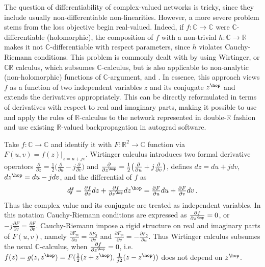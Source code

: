 \documentclass[a4paper,10pt]{article}
\newcommand{\real}{\mathbb{R}}
\newcommand{\cplx}{\mathbb{C}}
\begin{document}
The question of differentiability of complex-valued networks is tricky, since they include
usually non-differentiable non-linearities. However, a more severe problem stems from the loss
objective begin real-valued. Indeed, if $f\colon \cplx \to \cplx$ were $\cplx$-differentiable
(holomorphic), the composition of $f$ with a non-trivial $h \colon \cplx\to \real$ makes it
not $\cplx$-differentiable with respect parameters, since $h$ violates Cauchy-Riemann conditions.
This problem is commonly dealt with by using Wirtinger, or $\cplx\real$ calculus, which subsumes
$\cplx$-calculus, but is also applicable to non-analytic (non-holomorphic) functions of
$\cplx$-argument, \cite{adali_complex-valued_2011} and \cite{trabelsi_deep_2017}. In essence,
this approach views $f$ as a function of two independent variables $z$ and its conjugate $z^\hop$
and extends the derivatives appropriately. This can be directly reformulated in terms of
derivatives with respect to real and imaginary parts, making it possible to use and apply the
rules of $\real$-calculus to the network represented in double-$\real$ fashion and use existing
$\real$-valued backpropagation in autograd software.

Take $f\colon \cplx \to \cplx$ and identify it with $F\colon \real^2 \to \cplx$ function
via $F(u, v) = f(z)\vert_{z=u + j v}$. Wirtinger calculus introduces two formal derivative
operators
$
  \tfrac\partial{\partial z}
    = \tfrac12 \bigl(
      \tfrac\partial{\partial u}
      - j \tfrac\partial{\partial v}
    \bigr)
$ and $
  \tfrac\partial{\partial z^\hop}
    = \tfrac12 \bigl(
      \tfrac\partial{\partial u}
      + j \tfrac\partial{\partial v}
    \bigr)
$, defines $dz = du + j dv$, $dz^\hop = du - j dv$, and the differential of $f$ as
$$
df = \tfrac{\partial f}{\partial z} dz
    + \tfrac{\partial f}{\partial z^\hop} dz^\hop
   = \tfrac{\partial F}{\partial u} du
     + \tfrac{\partial F}{\partial v} dv
  \,. $$
Thus the complex value and its conjugate are treated as independent variables. In this notation
Cauchy-Riemann conditions are expressed as $
  \tfrac{\partial f}{\partial z^\hop} = 0
$, or $
  -j\tfrac{\partial F}{\partial v} = \tfrac{\partial F}{\partial v}
$. Cauchy-Riemann impose a rigid structure on real and imaginary parts of $F(u, v)$, namely $
  \tfrac{\partial F_{\Re }}{\partial u} = \tfrac{\partial F_{\Im }}{\partial v}
$ and $
  \tfrac{\partial F_{\Re }}{\partial v} = - \tfrac{\partial F_{\Im }}{\partial u}
$. Thus Wirtinger calculus subsumes the usual $\cplx$-calculus, when $
  \tfrac{\partial f}{\partial z^\hop} = 0
$, i.e. $
  f(z) = g(z, z^\hop) = F(\tfrac12 (z + z^\hop), \tfrac1{j 2} (z - z^\hop))
$ does not depend on $z^\hop$.
\end{document}
